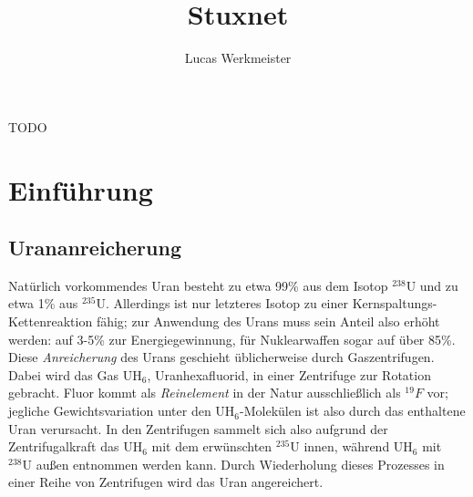 \documentclass{article}
\title{Stuxnet}
\author{Lucas Werkmeister}
\begin{document}
\maketitle

TODO

\section{Einführung}

\subsection{Urananreicherung}

Natürlich vorkommendes Uran besteht zu etwa 99\% aus dem Isotop $^{238}\mathrm U$ und zu etwa 1\% aus $^{235}\mathrm U$.
Allerdings ist nur letzteres Isotop zu einer Kernspaltungs-Kettenreaktion fähig;
zur Anwendung des Urans muss sein Anteil also erhöht werden: auf 3-5\% zur Energiegewinnung, für Nuklearwaffen sogar auf über 85\%.
Diese \emph{Anreicherung} des Urans geschieht üblicherweise durch Gaszentrifugen.
Dabei wird das Gas $\mathrm{UH}_6$, Uranhexafluorid, in einer Zentrifuge zur Rotation gebracht.
Fluor kommt als \emph{Reinelement} in der Natur ausschließlich als $^{19}F$ vor;
jegliche Gewichtsvariation unter den $\mathrm{UH}_6$-Molekülen ist also durch das enthaltene Uran verursacht.
In den Zentrifugen sammelt sich also aufgrund der Zentrifugalkraft das $\mathrm{UH}_6$ mit dem erwünschten $^{235}\mathrm U$ innen,
während $\mathrm{UH}_6$ mit $^{238}\mathrm U$ außen entnommen werden kann.
Durch Wiederholung dieses Prozesses in einer Reihe von Zentrifugen wird das Uran angereichert.
\end{document}
